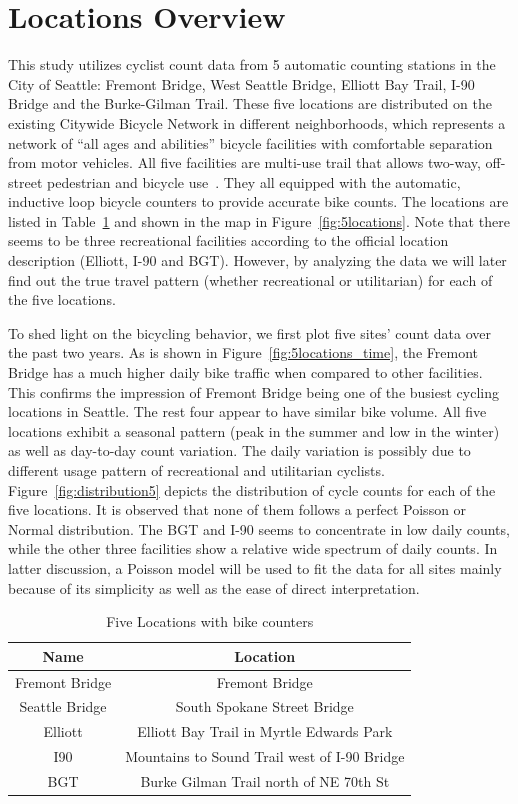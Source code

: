 \documentclass [11pt, proquest] {uwthesis}[2015/03/03]
\begin{document}
\section{Locations Overview}

This study utilizes cyclist count data from 5 automatic counting stations in the City of Seattle: Fremont Bridge, West Seattle Bridge, Elliott Bay Trail, I-90 Bridge and the Burke-Gilman Trail. These five locations are distributed on the existing Citywide Bicycle Network in different neighborhoods, which represents a network of “all ages and abilities” bicycle facilities with comfortable separation from motor vehicles. All five facilities are multi-use trail that allows two-way, off-street pedestrian and bicycle use~\cite{SDOT_BMP15}. They all equipped with the automatic, inductive loop bicycle counters to provide accurate bike counts. The locations are listed in Table~\ref{tbl:locationd} and shown in the map in Figure~\ref{fig:5locations}. Note that there seems to be three recreational facilities according to the official location description (Elliott, I-90 and BGT). However, by analyzing the data we will later find out the true travel pattern (whether recreational or utilitarian) for each of the five locations.

To shed light on the bicycling behavior, we first plot five sites' count data over the past two years. As is shown in Figure~\ref{fig:5locations_time}, the Fremont Bridge has a much higher daily bike traffic when compared to other facilities. This confirms the impression of Fremont Bridge being one of the busiest cycling locations in Seattle. The rest four appear to have similar bike volume. All five locations exhibit a seasonal pattern (peak in the summer and low in the winter) as well as day-to-day count variation. The daily variation is possibly due to different usage pattern of recreational and utilitarian cyclists. Figure~\ref{fig:distribution5} depicts the distribution of cycle counts for each of the five locations. It is observed that none of them follows a perfect Poisson or Normal distribution. The BGT and I-90 seems to concentrate in low daily counts, while the other three facilities show a relative wide spectrum of daily counts. In latter discussion, a Poisson model will be used to fit the data for all sites mainly because of its simplicity as well as the ease of direct interpretation. 

\begin{table}
 \centering 
  \caption{Five Locations with bike counters} 
\small
\begin{tabular}{ c | c } 
\hline 
  Name & Location \\ 
\hline
  Fremont Bridge & Fremont Bridge  \\
  Seattle Bridge & South Spokane Street Bridge  \\
  Elliott & Elliott Bay Trail in Myrtle Edwards Park  \\ 
  I90 & Mountains to Sound Trail west of I-90 Bridge \\ 
  BGT & Burke Gilman Trail north of NE 70th St\\ 
\hline 
\end{tabular} 
\label{tbl:locationd}
\end{table} 
\end{document}
